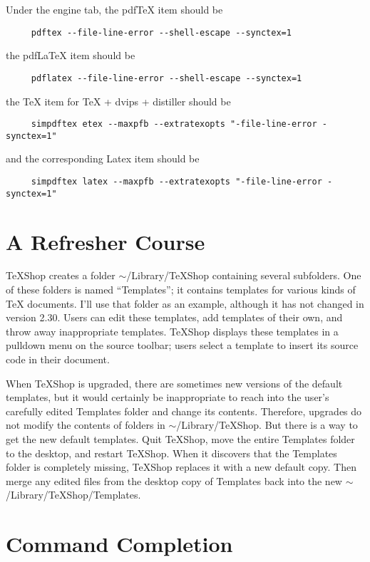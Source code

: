 \documentclass[11pt, oneside]{amsart}
\begin{document}
Under the engine tab, the pdfTeX item should be
\begin{verbatim}
     pdftex --file-line-error --shell-escape --synctex=1
\end{verbatim}
the pdfLaTeX item should be
\begin{verbatim}
     pdflatex --file-line-error --shell-escape --synctex=1 
\end{verbatim}
the TeX item for TeX + dvips + distiller should be
\begin{verbatim}
     simpdftex etex --maxpfb --extratexopts "-file-line-error -synctex=1"
\end{verbatim}
and the corresponding Latex item should be
\begin{verbatim}
     simpdftex latex --maxpfb --extratexopts "-file-line-error -synctex=1"
\end{verbatim}

\section{A Refresher Course}

TeXShop creates a folder $\sim$/Library/TeXShop containing several subfolders. One of these folders is named ``Templates''; it  contains templates for various kinds of TeX documents. I'll use that folder as an example, although it has not changed in version 2.30. Users can edit these templates, add templates of their own, and throw away inappropriate templates. TeXShop displays these templates in a pulldown menu on the source toolbar; users select a template to insert its source code in their document.

When TeXShop is upgraded, there are sometimes new versions of the default templates, but it would certainly be inappropriate to reach into the user's carefully edited Templates folder and change its contents. Therefore, upgrades do not modify the contents of folders in $\sim$/Library/TeXShop. But there is a way to get the new default templates. Quit TeXShop, move the entire Templates folder to the desktop, and restart TeXShop. When it discovers that the Templates folder is completely missing, TeXShop replaces it with a new default copy. Then merge any edited files from the desktop copy of Templates back into the new $\sim$/Library/TeXShop/Templates. 

\section{Command Completion}
\end{document}
